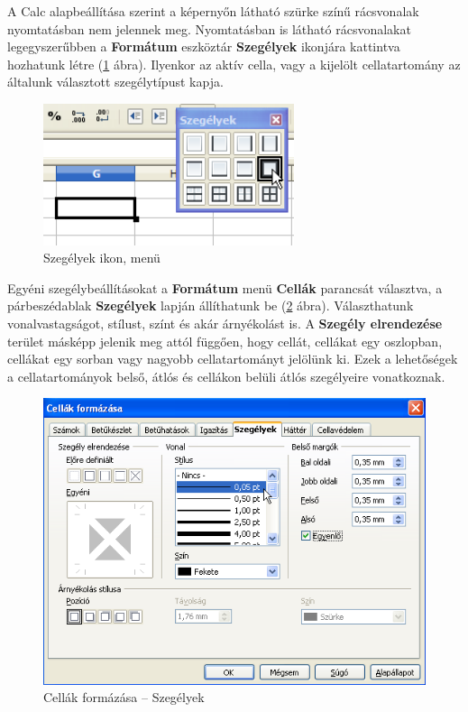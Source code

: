A Calc alapbeállítása szerint a képernyőn látható
szürke színű rácsvonalak nyomtatásban nem jelennek meg.
Nyomtatásban is látható rácsvonalakat legegyszerűbben a
\textbf{Formátum} eszköztár \textbf{Szegélyek} ikonjára kattintva
hozhatunk létre (\ref{SzegélyekIkon} ábra).  Ilyenkor az aktív
cella, vagy a kijelölt cellatartomány az általunk választott
szegélytípust kapja.

\begin{figure}[!h]
\begin{center}
\includegraphics[width=7.351cm]{oocalcv2-img15.png}
\caption{Szegélyek ikon, menü}\label{SzegélyekIkon}
\end{center}
\end{figure}

Egyéni szegélybeállításokat a \textbf{Formátum} menü
\textbf{Cellák} parancsát választva, a párbeszédablak
\textbf{Szegélyek} lapján állíthatunk be (\ref{CellaSzegélyek} ábra).
Választhatunk vonalvastagságot, stílust, színt és akár
árnyékolást is. A \textbf{Szegély elrendezése} terület
másképp jelenik meg attól függően, hogy cellát,
cellákat egy oszlopban, cellákat egy sorban vagy nagyobb
cellatartományt jelölünk ki. Ezek a lehetőségek a
cellatartományok belső, átlós és cellákon belüli
átlós szegélyeire vonatkoznak.

\begin{figure}[!h]
\begin{center}
\includegraphics[width=13.891cm]{oocalcv2-img16.png}
\caption{Cellák formázása --  Szegélyek}\label{CellaSzegélyek}
\end{center}
\end{figure}

